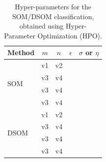 \documentclass[utf8]{frontiersSCNS} %
\begin{document}
\begin{table}\centering
	\begin{tabular}{@{}lcccc@{}}
		\toprule
		Method & $m$ & $n$ & $\epsilon$ & $\sigma$ or $\eta$ \\
		\midrule
		\multirow{4}{*}{SOM} & v1 & v2 \\
						  	  & v3 & v4 \\
						  	  & v3 & v4 \\
						  	  & v3 & v4 \\
		\midrule
		\multirow{4}{*}{DSOM} & v1 & v2 \\
							   & v3 & v4 \\
							   & v3 & v4 \\	
							   & v3 & v4 \\
		\bottomrule
	\end{tabular}
	\caption{Hyper-parameters for the SOM/DSOM classification, obtained using Hyper-Parameter Optimization (HPO).}
	\label{tab:hpo}
\end{table}
\end{document}
